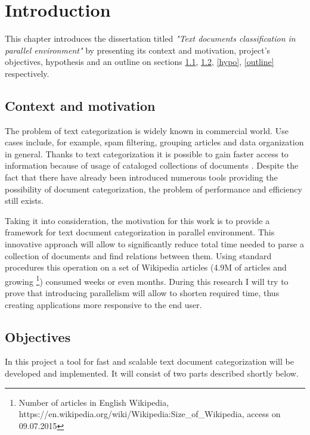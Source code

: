 \chapter{Introduction}
\label{int}

This chapter introduces the dissertation titled \textit{"Text documents classification in parallel environment"} by presenting its context and motivation, project’s objectives, hypothesis and an outline on sections \ref{con_mon}, \ref{obj}, \ref{hypo}, \ref{outline} respectively.

\section{Context and motivation}
\label{con_mon}
The problem of text categorization is widely known in commercial world. Use cases include, for example, spam filtering, grouping articles and data organization in general. Thanks to text categorization it is possible to gain faster access to information because of usage of cataloged collections of documents \cite{aut_wiki_cat_8}. Despite the fact that there have already been introduced numerous tools providing the possibility of document categorization, the problem of performance and efficiency still exists.

Taking it into consideration, the motivation for this work is to provide a framework for text document categorization in parallel environment. This innovative approach will allow to significantly reduce total time needed to parse a collection of documents and find relations between them. Using standard procedures this operation on a set of Wikipedia articles (4.9M of articles and growing \cite{wiki_art_num} \footnote{Number of articles in English Wikipedia, https://en.wikipedia.org/wiki/Wikipedia:Size\_of\_Wikipedia, access on 09.07.2015}) consumed weeks or even months. During this research I will try to prove that introducing parallelism will allow to shorten required time, thus creating applications more responsive to the end user.
\section{Objectives}
\label{obj}
In this project a tool for fast and scalable text document categorization will be developed and implemented. It will consist of two parts described shortly below.
